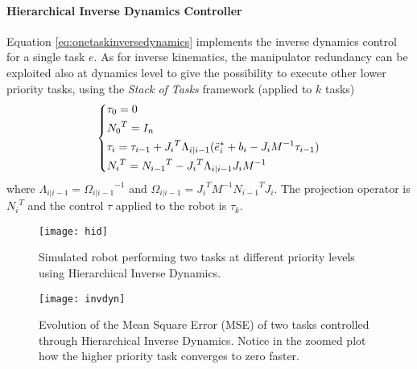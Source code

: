 \paragraph{Hierarchical Inverse Dynamics Controller}
Equation \eqref{eq:onetaskinversedynamics} implements the inverse dynamics control for a single task $e$. As for inverse kinematics, the manipulator redundancy can be exploited also at dynamics level to give the possibility to execute other lower priority tasks, using the \textit{Stack of Tasks} framework (applied to $k$ tasks)
\begin{equation}
\begin{dcases}
\tau_0 = 0\\
{N_0}^T = I_n\\
\tau_i = \tau_{i-1} + {J_i}^T\Lambda_{i\vert i-1}({\ddot{e}_i}^* + b_i - J_{i}M^{-1}\tau_{i-1}) \\
{N_i}^T = {N_{i-1}}^T - {J_i}^T\Lambda_{i\vert i-1}J_{i}M^{-1}
\end{dcases}
\end{equation}
where $\Lambda_{i\vert i-1} = {\Omega_{i\vert i-1}}^{-1}$ and ${\Omega_{i\vert i-1}} = {J_i}^{T}M^{-1}{N_{i-1}}^TJ_i$. The projection operator is ${N_i}^T$ and the control $\tau$ applied to the robot is $\tau_k$.
\begin{figure}[H]
\centering
\texttt{[image: hid]}
\caption{Simulated robot performing two tasks at different priority levels using Hierarchical Inverse Dynamics.}
\end{figure}
\begin{figure}[H]
\centering
\texttt{[image: invdyn]}
\caption[Evolution of the Mean Square Error (MSE) of two tasks controlled through Hierarchical Inverse Dynamics.]{Evolution of the Mean Square Error (MSE) of two tasks controlled through Hierarchical Inverse Dynamics. Notice in the zoomed plot how the higher priority task converges to zero faster.}
\end{figure}

